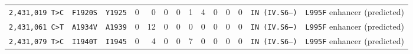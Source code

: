 \begin{tabular}{lllrrrrrrrrrll}
\texttt{2,431,019 T>C} & \texttt{F1920S} & \texttt{Y1925} & 0 & 0 & 0 & 0 & 1 & 4 & 0 & 0 & 0 & \texttt{IN (IV.S6--)} & \texttt{L995F} enhancer (predicted) \\

\texttt{2,431,061 C>T} & \texttt{A1934V} & \texttt{A1939} & 0 & 12 & 0 & 0 & 0 & 0 & 0 & 0 & 0 & \texttt{IN (IV.S6--)} & \texttt{L995F} enhancer (predicted) \\

\texttt{2,431,079 T>C} & \texttt{I1940T} & \texttt{I1945} & 0 & 4 & 0 & 0 & 7 & 0 & 0 & 0 & 0 & \texttt{IN (IV.S6--)} & \texttt{L995F} enhancer (predicted) \\

\bottomrule
\end{tabular}
